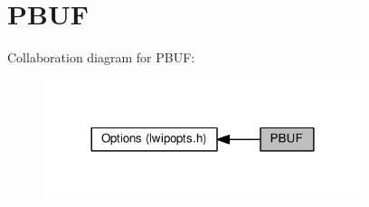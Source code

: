 \hypertarget{group__lwip__opts__pbuf}{}\section{P\+B\+UF}
\label{group__lwip__opts__pbuf}
Collaboration diagram for P\+B\+UF\+:
\nopagebreak
\begin{figure}[H]
\begin{center}
\leavevmode
\includegraphics[width=264pt]{group__lwip__opts__pbuf}
\end{center}
\end{figure}

